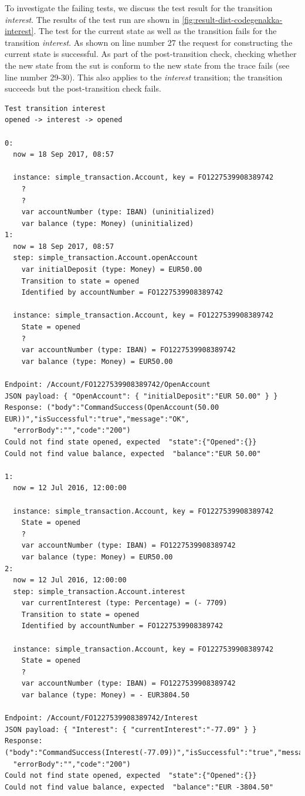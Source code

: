 To investigate the failing tests, we discuss the test result for the transition
\textit{interest}. The results of the test run are shown in
\autoref{fig:result-dist-codegenakka-interest}. The test for the current state
as well as the transition fails for the transition \textit{interest}.
As shown on line number 27 the request for constructing the current state is
successful. As part of the post-transition check, checking whether the new state
from the \gls{sut} is conform to the new state from the trace fails
(see line number 29-30). This also applies to the \textit{interest} transition;
the transition succeeds but the post-transition check fails.

\begin{sourcecode}[h!]
\begin{lstlisting}[]
Test transition interest
opened -> interest -> opened

0:
  now = 18 Sep 2017, 08:57

  instance: simple_transaction.Account, key = FO1227539908389742
    ?
    ?
    var accountNumber (type: IBAN) (uninitialized)
    var balance (type: Money) (uninitialized)
1:
  now = 18 Sep 2017, 08:57
  step: simple_transaction.Account.openAccount
    var initialDeposit (type: Money) = EUR50.00
    Transition to state = opened
    Identified by accountNumber = FO1227539908389742

  instance: simple_transaction.Account, key = FO1227539908389742
    State = opened
    ?
    var accountNumber (type: IBAN) = FO1227539908389742
    var balance (type: Money) = EUR50.00

Endpoint: /Account/FO1227539908389742/OpenAccount
JSON payload: { "OpenAccount": { "initialDeposit":"EUR 50.00" } }
Response: ("body":"CommandSuccess(OpenAccount(50.00 EUR))","isSuccessful":"true","message":"OK",
  "errorBody":"","code":"200")
Could not find state opened, expected  "state":{"Opened":{}}
Could not find value balance, expected  "balance":"EUR 50.00"

1:
  now = 12 Jul 2016, 12:00:00

  instance: simple_transaction.Account, key = FO1227539908389742
    State = opened
    ?
    var accountNumber (type: IBAN) = FO1227539908389742
    var balance (type: Money) = EUR50.00
2:
  now = 12 Jul 2016, 12:00:00
  step: simple_transaction.Account.interest
    var currentInterest (type: Percentage) = (- 7709)
    Transition to state = opened
    Identified by accountNumber = FO1227539908389742

  instance: simple_transaction.Account, key = FO1227539908389742
    State = opened
    ?
    var accountNumber (type: IBAN) = FO1227539908389742
    var balance (type: Money) = - EUR3804.50

Endpoint: /Account/FO1227539908389742/Interest
JSON payload: { "Interest": { "currentInterest":"-77.09" } }
Response: ("body":"CommandSuccess(Interest(-77.09))","isSuccessful":"true","message":"OK",
  "errorBody":"","code":"200")
Could not find state opened, expected  "state":{"Opened":{}}
Could not find value balance, expected  "balance":"EUR -3804.50"
\end{lstlisting}
\caption{}\label{fig:result-dist-codegenakka-interest}
\end{sourcecode}
\FloatBarrier

